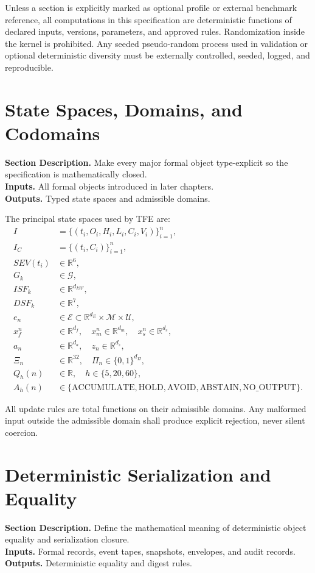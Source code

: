 \documentclass[11pt]{report}
\newcommand{\meta}[3]{\textbf{Section Description.} #1\\
\textbf{Inputs.} #2\\
\textbf{Outputs.} #3\par}
\begin{document}
Unless a section is explicitly marked as optional profile or external benchmark reference, all computations in this specification are deterministic functions of declared inputs, versions, parameters, and approved rules. Randomization inside the kernel is prohibited. Any seeded pseudo-random process used in validation or optional deterministic diversity must be externally controlled, seeded, logged, and reproducible.

\section{State Spaces, Domains, and Codomains}
\meta{Make every major formal object type-explicit so the specification is mathematically closed.}{All formal objects introduced in later chapters.}{Typed state spaces and admissible domains.}

The principal state spaces used by TFE are:
\begin{align*}
I &= \{(t_i,O_i,H_i,L_i,C_i,V_i)\}_{i=1}^{n},\\
I_C &= \{(t_i,C_i)\}_{i=1}^{n},\\
SEV(t_i) &\in \mathbb{R}^{6},\\
G_k &\in \mathcal{G},\\
ISF_k &\in \mathbb{R}^{d_{ISF}},\\
DSF_k &\in \mathbb{R}^{7},\\
e_n &\in \mathcal{E}\subset \mathbb{R}^{d_E}\times\mathcal{M}\times\mathcal{U},\\
x_f^n &\in \mathbb{R}^{d_f},\quad x_m^n \in \mathbb{R}^{d_m},\quad x_s^n\in\mathbb{R}^{d_s},\\
a_n &\in \mathbb{R}^{d_a},\quad z_n\in\mathbb{R}^{d_z},\\
\Xi_n &\in \mathbb{R}^{32},\quad \Pi_n\in\{0,1\}^{d_{\Pi}},\\
Q_h(n) &\in \mathbb{R},\quad h\in\{5,20,60\},\\
A_h(n) &\in \{\text{ACCUMULATE},\text{HOLD},\text{AVOID},\text{ABSTAIN},\text{NO\_OUTPUT}\}.
\end{align*}

All update rules are total functions on their admissible domains. Any malformed input outside the admissible domain shall produce explicit rejection, never silent coercion.

\section{Deterministic Serialization and Equality}
\meta{Define the mathematical meaning of deterministic object equality and serialization closure.}{Formal records, event tapes, snapshots, envelopes, and audit records.}{Deterministic equality and digest rules.}
\end{document}
